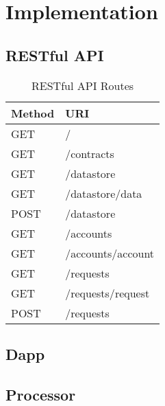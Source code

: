 \chapter{Implementation}
\label{implemenation}

\section{RESTful API}

\begin{table}[ht!]
\centering
\begin{tabular}{|l|l|}
\hline
 Method & URI  \\ \hline
 GET & /\  \\ \hline
 GET &  /contracts \\ \hline
 GET &  /datastore \\ \hline
 GET &  /datastore/{data} \\ \hline
 POST &  /datastore\\ \hline
 GET &  /accounts \\ \hline
 GET &  /accounts/{account} \\ \hline
 GET &  /requests \\ \hline
 GET &  /requests/{request} \\ \hline
 POST &  /requests \\ \hline
\end{tabular}
\caption{RESTful API Routes}
\label{table:api_routes}
\end{table}

\section{Dapp}
\section{Processor}


